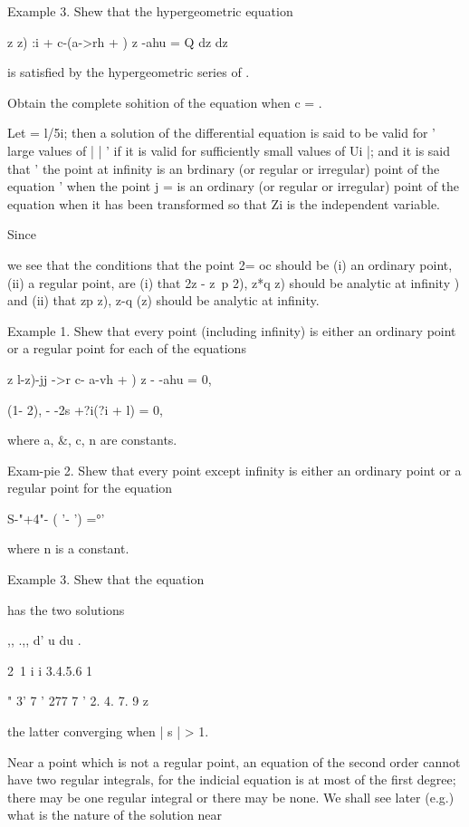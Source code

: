 %
%

Example 3. Shew that the hypergeometric equation

z z) :i + c-(a->rh + ) z -ahu = Q dz dz

is satisfied by the hypergeometric series of .

Obtain the complete sohition of the equation when c = .


Let = l/5i; then a solution of the differential equation is said to be
valid for ' large values of | | ' if it is valid for sufficiently
small values of Ui |; and it is said that ' the point at infinity is
an brdinary (or regular or irregular) point of the equation ' when the
point j = is an ordinary (or regular or irregular) point of the
equation when it has been transformed so that Zi is the independent
variable.

Since

we see that the conditions that the point 2= oc should be (i) an
ordinary point, (ii) a regular point, are (i) that 2z - z~p 2), z*q z)
should be analytic at infinity ) and (ii) that zp z), z-q (z)
should be analytic at infinity.

Example 1. Shew that every point (including infinity) is either an
ordinary point or a regular point for each of the equations

z l-z)-jj ->r c- a-vh + ) z - -ahu = 0,

(1- 2), - -2s +?i(?i + l) = 0,

where a, \&, c, n are constants.

Exam-pie 2. Shew that every point except infinity is either an
ordinary point or a regular point for the equation

 S-"+4"- ( '- ') =°'

where n is a constant.

Example 3. Shew that the equation

has the two solutions

,, .,, d' u du .

2\ 1 i i 3.4.5.6 1

 " 3' 7 ' 277 7 ' 2. 4. 7. 9 z

the latter converging when | s | > 1.


Near a point which is not a regular point, an equation of the second
order cannot have two regular integrals, for the indicial equation is
at most of the first degree; there may be one regular integral or
there may be none. We shall see later (e.g.) what is the nature
of the solution near

